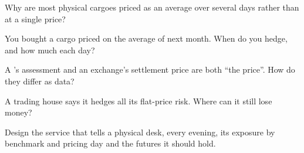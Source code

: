 \begin{interviewq}\label{iq:m3:physical-commodity-markets:2}
Why are most physical cargoes priced as an average over several days rather than at
a single price?
\end{interviewq}

\begin{interviewq}\label{iq:m3:physical-commodity-markets:3}
You bought a cargo priced on the average of next month. When do you hedge, and how
much each day?
\end{interviewq}

\begin{interviewq}\label{iq:m3:physical-commodity-markets:4}
A 's assessment and an exchange's settlement price are both
``the price''. How do they differ as data?
\end{interviewq}

\begin{interviewq}\label{iq:m3:physical-commodity-markets:5}
A trading house says it hedges all its flat-price risk. Where can it still lose
money?
\end{interviewq}

\begin{interviewq}\label{iq:m3:physical-commodity-markets:6}
Design the service that tells a physical desk, every evening, its exposure by
benchmark and pricing day and the futures it should hold.
\end{interviewq}
